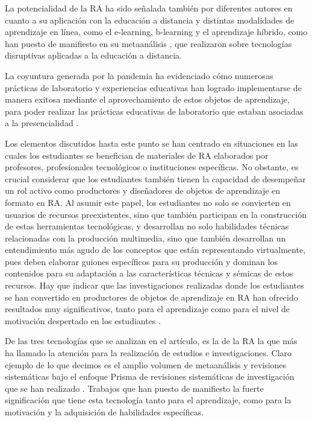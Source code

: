 \documentclass[spanish]{textolivre}
\begin{document}
La potencialidad de la RA ha sido señalada también por diferentes autores en cuanto a su aplicación con la educación a distancia y distintas modalidades de aprendizaje en línea, como el e-learning, b-learning y el aprendizaje híbrido, como han puesto de manifiesto en su metaanálisis \textcite{gonzalez_2020}, que realizaron sobre tecnologías disruptivas aplicadas a la educación a distancia.

La coyuntura generada por la pandemia ha evidenciado cómo numerosas prácticas de laboratorio y experiencias educativas han logrado implementarse de manera exitosa mediante el aprovechamiento de estos objetos de aprendizaje, para poder realizar las prácticas educativas de laboratorio que estaban asociadas a la presencialidad \cite{romero2023realidad}.

Los elementos discutidos hasta este punto se han centrado en situaciones en las cuales los estudiantes se benefician de materiales de RA elaborados por profesores, profesionales tecnológicos o instituciones específicas. No obstante, es crucial considerar que los estudiantes también tienen la capacidad de desempeñar un rol activo como productores y diseñadores de objetos de aprendizaje en formato en RA. Al asumir este papel, los estudiantes no solo se convierten en usuarios de recursos preexistentes, sino que también participan en la construcción de estas herramientas tecnológicas, y desarrollan no solo habilidades técnicas relacionadas con la producción multimedia, sino que también desarrollan un entendimiento más agudo de los conceptos que están representando virtualmente, pues deben elaborar guiones específicos para su producción y dominan los contenidos para su adaptación a las características técnicas y sémicas de estos recursos. Hay que indicar que las investigaciones realizadas donde los estudiantes se han convertido en productores de objetos de aprendizaje en RA han ofrecido resultados muy significativos, tanto para el aprendizaje como para el nivel de motivación despertado en los estudiantes \cite{cabero_2018,cabero2019educational}.

De las tres tecnologías que se analizan en el artículo, es la de la RA la que más ha llamado la atención para la realización de estudios e investigaciones. Claro ejemplo de lo que decimos es el amplio volumen de metaanálisis y revisiones sistemáticas bajo el enfoque Prisma de revisiones sistemáticas de investigación \cite{page2022declaracion} que se han realizado \cite{bermejo_2023,gopalan2023systematic,oueida2023augmented,algerafi2023understanding}. Trabajos que han puesto de manifiesto la fuerte significación que tiene esta tecnología tanto para el aprendizaje, como para la motivación y la adquisición de habilidades específicas.
\end{document}
